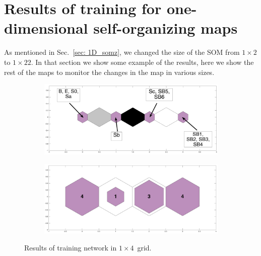 
\newpage
\appendix
\section{Results of training for one-dimensional self-organizing maps}
\label{app: high_Z_1d_soms}
As mentioned in Sec.~\ref{sec: 1D_somz}, we changed the size of the SOM from $1\times2$ to $1\times22$. In that section we show some example of the results, here we show the rest of the maps to monitor the changes in the map in various sizes.

\label{app: 1d}
    \begin{figure}
        \begin{subfigure}[b]{0.5\textwidth}
            \centering
            \includegraphics[width=\textwidth]{../images0.01/1d/apps/dist_1_by_4.png}
        \end{subfigure}
        \hfill
        \begin{subfigure}[b]{0.5\textwidth}
             \includegraphics[width=\textwidth]{../images0.01/1d/apps/hit_t_1_by_4.png}
        \end{subfigure}
                \caption{Results of training network in $1\times4$~grid.}
         \label{fig: 1by4T}
    \end{figure}
    
